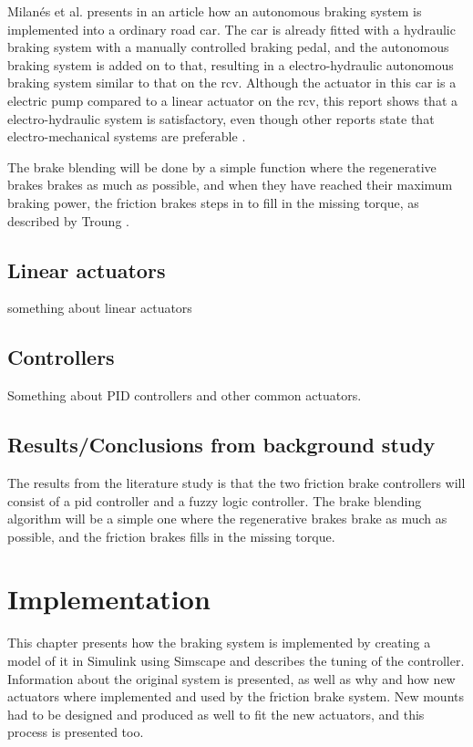 \documentclass[a4paper,11pt]{kth-mag}
\begin{document}
Milan{\'e}s et al. \cite{milanes2010electro} presents in an article how an autonomous braking system is implemented into a ordinary road car. The car is already fitted with a hydraulic braking system with a manually controlled braking pedal, and the autonomous braking system is added on to that, resulting in a electro-hydraulic autonomous braking system similar to that on the \gls{rcv}. 
Although the actuator in this car is a electric pump compared to a linear actuator on the \gls{rcv}, this report shows that a electro-hydraulic system is satisfactory, even though other reports state that electro-mechanical systems are preferable \cite{MechatronicsBook} \cite{Xiang}. \newline

The brake blending will be done by a simple function where the regenerative brakes brakes as much as possible, and when they have reached their maximum braking power, the friction brakes steps in to fill in the missing torque, as described by Troung \cite{truongdevelopment}. \newline

\section{Linear actuators}
something about linear actuators
\section{Controllers}
Something about PID controllers and other common actuators.
\section{Results/Conclusions from background study}
The results from the literature study is that the two friction brake controllers will consist of a \gls{pid} controller and a fuzzy logic controller. 
The brake blending algorithm will be a simple one where the regenerative brakes brake as much as possible, and the friction brakes fills in the missing torque. 



\chapter{Implementation}

This chapter presents how the braking system is implemented by creating a model of it in Simulink using Simscape and describes the tuning of the controller. Information about the original system is presented, as well as why and how new actuators where implemented and used by the friction brake system. New mounts had to be designed and produced as well to fit the new actuators, and this process is presented too. \\
\end{document}
